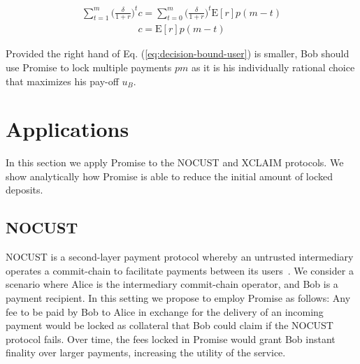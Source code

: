 \documentclass[runningheads]{llncs}
\newcommand{\sys}{Promise\xspace}
\newcommand{\aza}[1]{\todo[linecolor=blue,backgroundcolor=blue!25,bordercolor=blue,inline,caption={}]{Comment by Alexei: #1}}
\begin{document}
\begin{align}
    \sum_{t=1}^m \big( \frac{\delta}{1+r} \big)^t c = \sum_{t=0}^m \big( \frac{\delta}{1+r} \big)^t \mathrm{E}[r]p(m-t)
\end{align}
\begin{align}
\label{eq:decision-bound-user}
c = \mathrm{E}[r]p(m-t)    
\end{align}

Provided the right hand of Eq. (\ref{eq:decision-bound-user}) is smaller, Bob should use \sys to lock multiple payments $pm$ as it is his individually rational choice that maximizes his pay-off $u_B$.









\section{Applications}
\label{sec:application}

In this section we apply \sys to the NOCUST and XCLAIM protocols.
We show analytically how \sys is able to reduce the initial amount of locked deposits.

\subsection{NOCUST}

NOCUST is a second-layer payment protocol whereby an untrusted intermediary operates a commit-chain to facilitate payments between its users~\cite{Khalil2019NOCUST}. We consider a scenario where Alice is the intermediary commit-chain operator, and Bob is a payment recipient. In this setting we propose to employ \sys as follows: Any fee to be paid by Bob to Alice in exchange for the delivery of an incoming payment would be locked as collateral that Bob could claim if the NOCUST protocol fails. Over time, the fees locked in \sys would grant Bob instant finality over larger payments, increasing the utility of the service.


\end{document}
